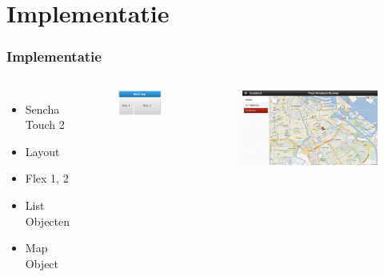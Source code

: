\documentclass[10pt,a4paper]{beamer}
\begin{document}
\section{Implementatie}
\begin{frame}
\frametitle{Implementatie}
\begin{columns}
\column{5cm}
\begin{itemize}
\item Sencha Touch 2
\item Layout
\item Flex 1, 2
\item List Objecten
\item Map Object
\end{itemize}
\column{5cm}
\begin{figure}
\includegraphics[scale=0.3]{docktop.png}
\end{figure}
\begin{figure}
\includegraphics[scale=0.1]{ui/fsb_layout.png}
\end{figure}
\end{columns}
\end{frame}
\end{document}

